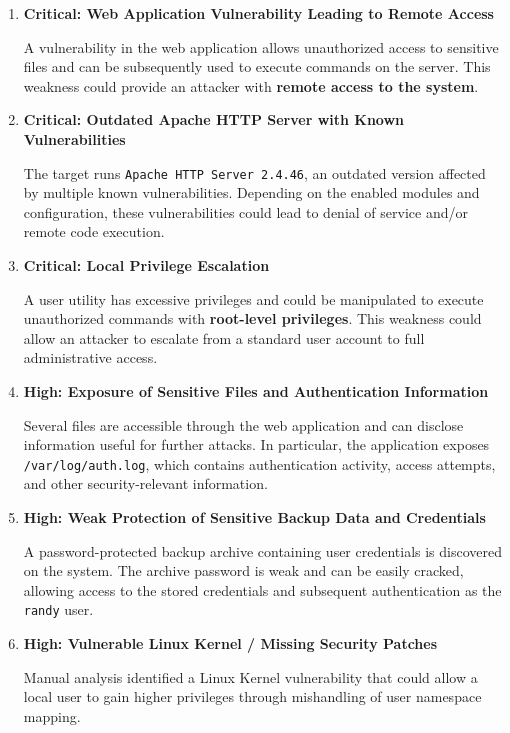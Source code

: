 \begin{enumerate}
	\item \textbf{Critical: Web Application Vulnerability Leading to Remote Access}
	
	A vulnerability in the web application allows unauthorized access to sensitive files and can be subsequently used to execute commands on the server. This weakness could provide an attacker with \textbf{remote access to the system}.
	
	\item \textbf{Critical: Outdated Apache HTTP Server with Known Vulnerabilities}
	
	The target runs \texttt{Apache HTTP Server 2.4.46}, an outdated version affected by multiple known vulnerabilities. Depending on the enabled modules and configuration, these vulnerabilities could lead to denial of service and/or remote code execution.
	
	\item \textbf{Critical: Local Privilege Escalation}
	
	A user utility has excessive privileges and could be manipulated to execute unauthorized commands with \textbf{root-level privileges}. This weakness could allow an attacker to escalate from a standard user account to full administrative access.
	
	\item \textbf{High: Exposure of Sensitive Files and Authentication Information}
	
	Several files are accessible through the web application and can disclose information useful for further attacks. In particular, the application exposes \texttt{/var/log/auth.log}, which contains authentication activity, access attempts, and other security-relevant information.
	
	\item \textbf{High: Weak Protection of Sensitive Backup Data and Credentials}
	
	A password-protected backup archive containing user credentials is discovered on the system. The archive password is weak and can be easily cracked, allowing access to the stored credentials and subsequent authentication as the \texttt{randy} user.
	
	\item \textbf{High: Vulnerable Linux Kernel / Missing Security Patches}
	
	Manual analysis identified a Linux Kernel vulnerability that could allow a local user to gain higher privileges through mishandling of user namespace mapping.
\end{enumerate}


